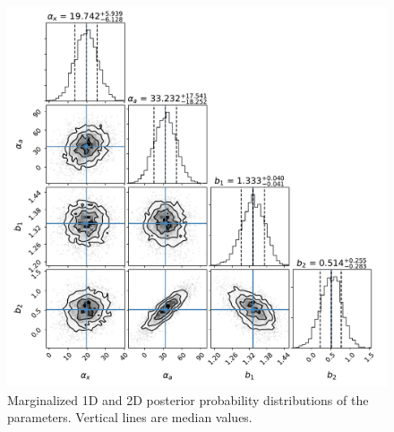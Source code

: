 \begin{figure}
\includegraphics[width=\linewidth,trim={0.4cm 0.2cm 0.2cm 0.2cm},clip]{figures/corner_plot.pdf}
\caption{Marginalized 1D and 2D posterior probability distributions of the parameters. Vertical lines are median values.}
\label{fig:lptmcmc}
\end{figure}

